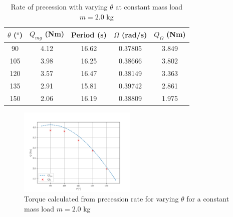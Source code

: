 \documentclass[8pt]{article}
\begin{document}
\begin{table}[H]
    \centering
    \begin{tabular}{|c|c|c|c|c|}
        \hline
        $\theta$ ($^o$) & $Q_{mg}$ (Nm) & Period (s) & $\Omega$ (rad/s) & $Q_{\Omega} $ (Nm) \\
        \hline
        90 & 4.12 & 16.62 & 0.37805 & 3.849\\
        105 & 3.98 & 16.25 & 0.38666 & 3.802\\
        120 & 3.57 & 16.47 & 0.38149 & 3.363\\
        135 & 2.91 & 15.81 & 0.39742 & 2.861\\
        150 & 2.06 & 16.19 & 0.38809 & 1.975\\
        \hline
    \end{tabular}
    \caption{Rate of precession with varying $\theta$ at constant mass load $m = 2.0$ kg}
    \label{tab:precession_vs_theta}
\end{table}

\begin{figure}[H]
    \centering
    \includegraphics[width=0.5\textwidth]{precession_vs_theta.png}
    \caption{Torque calculated from precession rate for varying $\theta$ for a constant mass load $m = 2.0$ kg}
    \label{fig:precession_vs_theta}
\end{figure}

\end{document}
